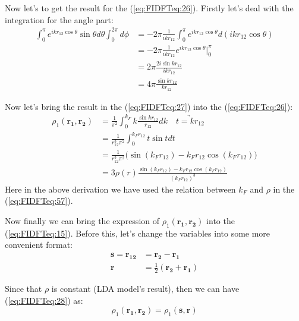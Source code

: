 Now let's to get the result for the (\ref{eq:FIDFTeq:26}). Firstly
let's deal with the integration for the angle part:
\begin{align}\label{eq:FIDFTeq:27}
\int_{0}^{\pi}e^{ikr_{12}\cos\theta}\sin\theta d\theta
\int_{0}^{2\pi}d\phi &= -2\pi\frac{1}{ikr_{12}}
\int_{0}^{\pi}e^{ikr_{12}\cos\theta} d(ikr_{12}\cos\theta)
\nonumber \\
&=-2\pi\frac{1}{ikr_{12}}e^{ikr_{12}\cos\theta}\Big|^{\pi}_{0}\nonumber \\
&=2\pi\frac{2i\sin kr_{12}}{ikr_{12}} \nonumber \\
&=4\pi\frac{\sin kr_{12}}{kr_{12}}
\end{align}

Now let's bring the result in the (\ref{eq:FIDFTeq:27}) into the
(\ref{eq:FIDFTeq:26}):
\begin{align}\label{eq:FIDFTeq:28}
\rho_{1}(\mathbf{r_{1}},\mathbf{r_{2}}) &=\frac{1}{\pi^{2}}
\int_{0}^{k_{F}}k\frac{\sin kr_{12}}{r_{12}}dk \quad
\underrightarrow{t=kr_{12}} \nonumber \\
&=\frac{1}{r_{12}^{3}\pi^{2}} \int_{0}^{k_{F}r_{12}}t\sin tdt \nonumber \\
&=\frac{1}{r_{12}^{3}\pi^{2}} \Big(\sin (k_{F}r_{12}) - k_{F}r_{12}\cos
(k_{F}r_{12})\Big)  \nonumber \\
&=3\rho(r)\frac{\sin (k_{F}r_{12}) - k_{F}r_{12}\cos (k_{F}r_{12})}{(k_{F}r_{12})^{3}}
\end{align}
Here in the above derivation we have used the relation between
$k_{F}$ and $\rho$ in the (\ref{eq:FIDFTeq:57}).

Now finally we can bring the expression of
$\rho_{1}(\mathbf{r_{1}},\mathbf{r_{2}})$ into the
(\ref{eq:FIDFTeq:15}). Before this, let's change the variables into
some more convenient format:
\begin{align}\label{}
\mathbf{s} = \mathbf{r_{12}} &= \mathbf{r_{2}} - \mathbf{r_{1}}
\nonumber \\
\mathbf{r} &= \frac{1}{2}(\mathbf{r_{2}} + \mathbf{r_{1}})
\end{align}

Since that $\rho$ is constant (LDA model's result), then
we can have (\ref{eq:FIDFTeq:28}) as:
\begin{equation}\label{}
\rho_{1}(\mathbf{r_{1}},\mathbf{r_{2}}) = \rho_{1}(\mathbf{s},
\mathbf{r})
\end{equation}

